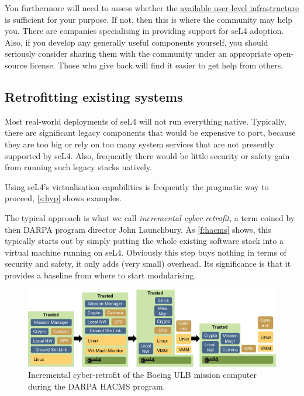 \documentclass[english,a4paper,12pt\ifDraft,draft\fi]{report}
\newcommand{\SSect}[1]{\subsection{#1}}
\newcommand{\SSect}[1]{\section{#1}}
\providecommand{\href}[2]{\url{#2}}
\begin{document}
  You furthermore will need to assess whether the
  \href{https://docs.sel4.systems/projects/available-user-components.html}{available
    user-level infrastructure} is sufficient for your purpose. If not,
  then this is where the community may help you. There are companies
  specialising in providing support for seL4 adoption. Also, if you
  develop any generally useful components yourself, you should
  seriously consider sharing them with the community under an
  appropriate open-source license. Those who give back will find it
  easier to get help from others.

  \SSect{Retrofitting existing systems}

  Most real-world deployments of seL4 will not run everything
  native. Typically, there are significant legacy components that would
  be expensive to port, because they are too big or rely on too many
  system services that are not presently supported by seL4. Also,
  frequently there would be little security or safety gain from
  running such legacy stacks natively.

  Using seL4's virtualisation capabilities is frequently the pragmatic
  way to proceed, \autoref{s:hyp} shows examples.

  The typical approach is what we call \emph{incremental
    cyber-retrofit}, a term coined by then DARPA program director John
  Launchbury. As \autoref{f:hacms} shows, this typically starts out by simply putting the whole existing
  software stack into a virtual machine running on seL4. Obviously
  this step buys nothing in terms of security and safety, it only adds
  (very small) overhead. Its significance is that it provides a
  baseline from where to start modularising.

  \begin{figure}[tb]
    \centering
    \includegraphics{hacms}
    \caption[Incremental cyber-retrofit on the ULB.]{Incremental
      cyber-retrofit of the Boeing ULB mission computer during the
      DARPA HACMS program.}
    \label{f:hacms}
  \end{figure}
\end{document}
